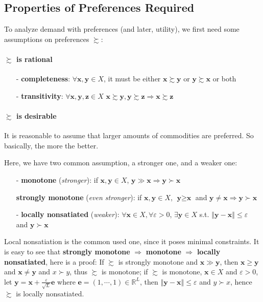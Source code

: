 \subsection{Properties of Preferences Required}
To analyze demand with preferences (and later, utility), we first need some assumptions on preferences $\succsim$:

\paragraph*{$\succsim$ is rational}
\begin{enumerate}
    \item[-] \textbf{completeness}: $\forall \mathbf{x},\mathbf{y}\in X$, it must be either $\mathbf{x}\succsim \mathbf{y}$ or $\mathbf{y}\succsim \mathbf{x}$ or both
    \item[-] \textbf{transitivity}: $\forall \mathbf{x},\mathbf{y},\mathbf{z} \in X$ $\mathbf{x} \succsim \mathbf{y},\mathbf{y}\succsim \mathbf{z}\Rightarrow \mathbf{x}\succsim \mathbf{z}$ 
\end{enumerate}

\paragraph*{$\succsim$ is desirable}
It is reasonable to assume that larger amounts of commodities are preferred. So basically, the more the better.

Here, we have two common assumption, a stronger one, and a weaker one:
\begin{enumerate}
    \item[-] \textbf{monotone} (\textit{stronger}): if $\textbf{x},\textbf{y}\in X$, $\textbf{y}\gg \textbf{x}\Rightarrow \textbf{y}\succ \textbf{x}$
    
    \textbf{strongly monotone} (\textit{even stronger}): if $\textbf{x},\textbf{y}\in X$, $\textbf{y}\geq \textbf{x}$ and $\textbf{y}\neq \textbf{x}\Rightarrow \textbf{y}\succ \textbf{x}$
    \item[-] \textbf{locally nonsatiated} (\textit{weaker}): $\forall \mathbf{x} \in X, \forall \varepsilon >0$, $\exists \mathbf{y}\in X$ s.t. $\left\Vert \mathbf{y}-\mathbf{x} \right\Vert \leq \varepsilon$ and $\mathbf{y}\succ \mathbf{x}$
\end{enumerate}
Local nonsatiation is the common used one, since it poses minimal constraints. It is easy to see that \textbf{strongly monotone} $\Rightarrow$ \textbf{monotone} $\Rightarrow$ \textbf{locally nonsatiated}, here is a proof:
If $\succsim$ is strongly monotone and $\mathbf{x} \gg \mathbf{y}$, then $\mathbf{x}\geq \mathbf{y}$ and $\mathbf{x}\neq \mathbf{y}$ and $x\succ y$, thus $\succsim$ is monotone; 
if $\succsim$ is monotone, $\mathbf{x}\in X$ and $\varepsilon>0$, let $\mathbf{y}=\mathbf{x}+\frac{\varepsilon}{\sqrt{L}}\mathbf{e}$ where $\mathbf{e}=(1,\cdots,1)\in \mathbb{R}^L$, then $\left\Vert \mathbf{y}-\mathbf{x}\right\Vert\leq \varepsilon$ and $y\succ x$, hence $\succsim$ is locally nonsatiated.

